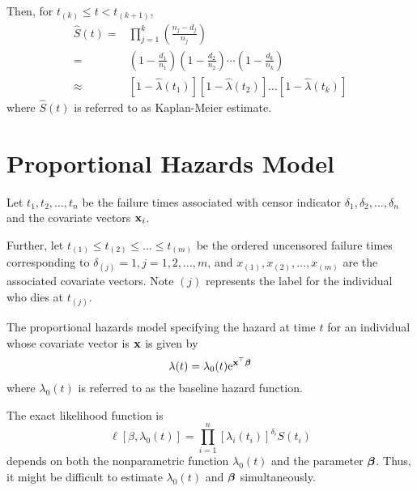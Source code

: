 Then, for $t_{(k)}\leq t<t_{(k+1)}$,
\begin{equation}
	\begin{aligned}
		\hat{S}(t)= & \prod_{j=1}^{k}\left(\frac{n_{j}-d_{j}}{n_{j}}\right)                                                                                             \\
		=           & \left(1-\frac{d_{1}}{n_{1}}\right)\left(1-\frac{d_{2}}{n_{2}}\right) \cdots\left(1-\frac{d_{k}}{n_{k}}\right)                                     \\
		\approx     & \left[1-\hat{\lambda}\left(t_{1}\right)\right]\left[1-\hat{\lambda}\left(t_{2}\right)\right] \ldots\left[1-\hat{\lambda}\left(t_{k}\right)\right]
	\end{aligned}
\end{equation}
where $\hat{S}(t)$ is referred to as Kaplan-Meier estimate.

\section{Proportional Hazards Model}

Let $t_{1},t_{2},\ldots,t_{n}$ be the failure times associated with censor indicator $\delta_{1},\delta_{2},\ldots,\delta_{n}$ and the covariate vectors ${\bf x}_{i}$.

Further, let $t_{(1)}\leq t_{(2)}\leq\ldots\leq t_{(m)}$ be the ordered uncensored failure times corresponding to $\delta_{(j)}=1,j=1,2,\ldots,m$, and $x_{(1)},x_{(2)},\ldots,x_{(m)}$ are the associated covariate vectors. Note $(j)$ represents the label for the individual who dies at $t_{(j)}$.

The proportional hazards model specifying the hazard at time $t$ for an individual whose covariate vector is ${\bf x}$ is given by
\begin{equation}
	\lambda(t)=\lambda_{0}(t)\mathrm{e}^{{\bf x}^{\top}\boldsymbol{\beta}}
\end{equation}
where $\lambda_{0}(t)$ is referred to as the baseline hazard function.

The exact likelihood function is
\begin{equation}
	\ell\left[\beta,\lambda_{0}(t)\right]=\prod_{i=1}^{n}\left[\lambda_{i}\left(t_{i}\right)\right]^{\delta_{i}}S\left(t_{i}\right)
\end{equation}
depends on both the nonparametric function $\lambda_{0}(t)$ and the parameter $\boldsymbol{\beta}$. Thus, it might be difficult to estimate $\lambda_{0}(t)$ and $\boldsymbol{\beta}$ simultaneously.

